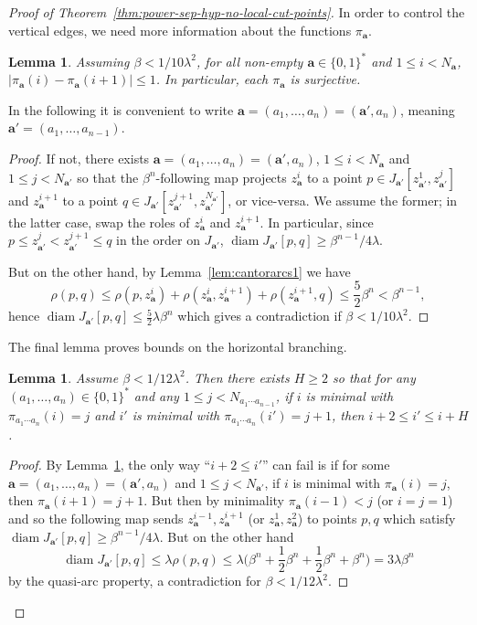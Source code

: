 \documentclass[11pt]{amsart}
\numberwithin{equation}{section}
\newtheorem{lemma}[equation]{Lemma}
\theoremstyle{citing}
\DeclareMathOperator{\diam}{diam}
\newcommand{\ba}{\mathbf{a}}
\numberwithin{equation}{section}
\begin{document}
\begin{proof}[Proof of Theorem~\ref{thm:power-sep-hyp-no-local-cut-points}]
	In order to control the vertical edges, we need more information about the functions $\pi_\ba$.
	\begin{lemma}\label{lem:cantorarcs2} Assuming $\beta<1/10\lambda^2$, for all non-empty $\ba \in \{0,1\}^*$ and $1 \leq i < N_\ba$,
	$|\pi_\ba(i)-\pi_\ba(i+1)| \leq 1$.  In particular, each $\pi_\ba$ is surjective.
	\end{lemma}
	In the following it is convenient to write $\ba=(a_1,\ldots,a_n)=(\ba',a_n)$, meaning $\ba'=(a_1,\ldots,a_{n-1})$.
	\begin{proof}
		If not, there exists $\ba=(a_1,\ldots,a_n)= (\ba',a_n)$, $1 \leq i < N_\ba$ and $1 \leq j < N_{\ba'}$ so that the $\beta^n$-following map projects 
		$z_\ba^i$ to a point $p \in J_{\ba'}[ z_{\ba'}^1, z_{\ba'}^j]$ and
		$z_\ba^{i+1}$ to a point $q \in J_{\ba'}[ z_{\ba'}^{j+1}, z_{\ba'}^{N_{\ba'}}]$,
		or vice-versa.  We assume the former; in the latter case, swap the roles of $z_\ba^i$ and $z_\ba^{i+1}$.
		In particular, since $p \leq z_{\ba'}^j < z_{\ba'}^{j+1} \leq q$ in the order on $J_{\ba'}$, $\diam J_{\ba'}[p,q] \geq \beta^{n-1}/4\lambda$.

		But on the other hand, by Lemma~\ref{lem:cantorarcs1} we have 
		\[ \rho(p,q) \leq \rho(p, z_\ba^i)+ \rho(z_\ba^i,z_\ba^{i+1})+\rho(z_\ba^{i+1},q) \leq \frac{5}{2}\beta^n < \beta^{n-1}, \]
		hence
		$\diam J_{\ba'}[p,q] \leq \frac{5}{2}\lambda \beta^n$
		which gives a contradiction if $\beta < 1/10\lambda^2$.
	\end{proof}

        The final lemma proves bounds on the horizontal branching.
        
	\begin{lemma}\label{lem:cantorarcs3}
		Assume $\beta < 1/12 \lambda^2$.  Then there exists $H\geq 2$ so that for any $(a_1,\ldots,a_n)\in \{0,1\}^*$ and any $1 \leq j < N_{a_1\cdots a_{n-1}}$, if $i$ is minimal with $\pi_{a_1\cdots a_n}(i)=j$ and $i'$ is minimal with $\pi_{a_1\cdots a_n}(i')=j+1$, then $i+2 \leq i' \leq i+H$.
	\end{lemma}
	\begin{proof}
		By Lemma~\ref{lem:cantorarcs2}, the only way ``$i+2 \leq i'$'' can fail is if for some $\ba=(a_1,\ldots, a_n)=(\ba',a_n)$ and $1 \leq j < N_{\ba'}$, if $i$ is minimal with $\pi_\ba(i)=j$, then $\pi_\ba(i+1)=j+1$.
		But then by minimality $\pi_\ba(i-1) < j$ (or $i=j=1$) and so the following map sends $z_\ba^{i-1}, z_\ba^{i+1}$ (or $z_\ba^1, z_\ba^2$) to points $p,q$ which satisfy  
		$\diam J_{\ba'}[p,q] \geq \beta^{n-1}/4\lambda$.
		But on the other hand 
		\[ \diam J_{\ba'}[p,q] \leq \lambda \rho(p,q) 
		\leq \lambda \bigg(\beta^n + \frac{1}{2}\beta^n + \frac{1}{2}\beta^n+\beta^n\bigg) = 3\lambda \beta^n \]
		by the quasi-arc property, a contradiction for $\beta < 1/12 \lambda^2$.


\end{proof}
\end{proof}
\end{document}
